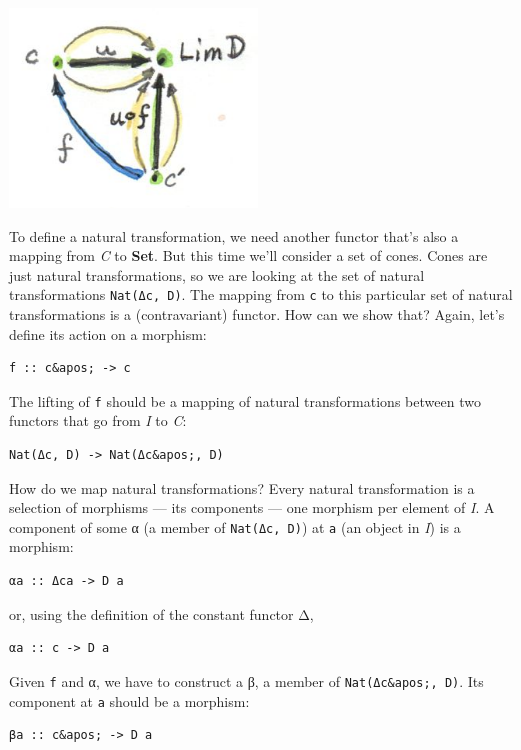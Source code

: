 \includegraphics[width=2.59375in]{images/homsetmapping.jpg}

To define a natural transformation, we need another functor that's also
a mapping from \emph{C} to \textbf{Set}. But this time we'll consider a
set of cones. Cones are just natural transformations, so we are looking
at the set of natural transformations \texttt{Nat(Δc,\ D)}. The mapping
from \texttt{c} to this particular set of natural transformations is a
(contravariant) functor. How can we show that? Again, let's define its
action on a morphism:

\begin{verbatim}
f :: c&apos; -> c
\end{verbatim}

The lifting of \texttt{f} should be a mapping of natural transformations
between two functors that go from \emph{I} to \emph{C}:

\begin{verbatim}
Nat(Δc, D) -> Nat(Δc&apos;, D)
\end{verbatim}

How do we map natural transformations? Every natural transformation is a
selection of morphisms --- its components --- one morphism per element
of \emph{I}. A component of some α (a member of \texttt{Nat(Δc,\ D)}) at
\texttt{a} (an object in \emph{I}) is a morphism:

\begin{verbatim}
αa :: Δca -> D a
\end{verbatim}

or, using the definition of the constant functor Δ,

\begin{verbatim}
αa :: c -> D a
\end{verbatim}

Given \texttt{f} and α, we have to construct a β, a member of
\texttt{Nat(Δc\&apos;,\ D)}. Its component at \texttt{a} should be a
morphism:

\begin{verbatim}
βa :: c&apos; -> D a
\end{verbatim}

